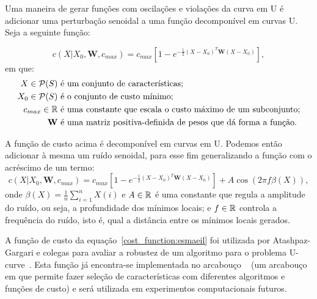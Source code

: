 Uma maneira de gerar funções com oscilações e violações da curva em U
é adicionar uma perturbação senoidal a uma função decomponível em curvas
U. Seja a seguinte função:

\begin{equation*} 
    c(X | X_0, {\mathbf W}, c_{max}) = c_{max} [1 - e^{- \frac{1}{2} (X - X_0)^T {\mathbf W} (X - X_0)}],
\end{equation*}
em que:
\begin{align*}
    X \in \mathcal{P}(S) & \text{ é um conjunto de características;} \\
    X_0 \in \mathcal{P} (S) & \text{ é o conjunto de custo mínimo;} \\
    c_{max} \in \mathbb{R} & \text{ é uma constante que escala o custo máximo de um subconjunto;} \\
    {\mathbf W} & \text { é uma matriz positiva-definida de pesos que dá forma a função.}
\end{align*}

A função de custo acima é decomponível em curvas em U. Podemos então 
adicionar à mesma um ruído senoidal, para esse fim generalizando a função com o acréscimo de um termo:
\begin{equation} \label{cost_function:esmaeil}
    c(X | X_0, {\mathbf W}, c_{max}) = c_{max} [1 - e^{- \frac{1}{2} (X - X_0)^T {\mathbf W} (X - X_0)}]  + A \cos (2\pi f \beta (X)),
\end{equation}
onde  $\beta (X) = \frac{1}{n} \sum_{i = 1}^{n} X (i)$ e 
$A \in \mathbb{R}$ é uma constante que regula a amplitude do ruído, 
ou seja, a profundidade dos mínimos locais; e $f \in \mathbb{R}$ controla a
frequência do ruído, isto é, qual a distância entre os mínimos locais 
gerados.

A função de custo da equação~\ref{cost_function:esmaeil} foi utilizada 
por Atashpaz-Gargari e colegas para avaliar a robustez de um algoritmo 
para o problema U-curve~\cite{AG+18}. Esta função já encontra-se 
implementada no arcabouço ~\cite{Reis+17} (um 
arcabouço em  que permite fazer seleção de características
com diferentes algoritmos e funções de custo) e será utilizada em 
experimentos computacionais futuros.
